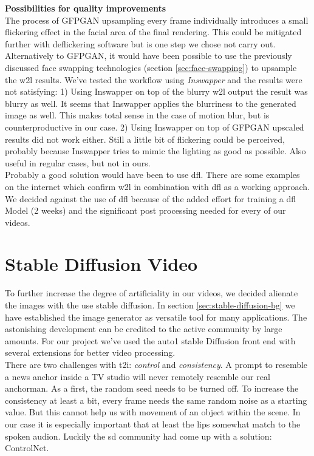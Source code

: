 \documentclass[
  a4paper,  %
  twoside,  %
  bibliography=totoc,
  headsepline,
  cleardoublepage=empty,
  parskip=half,
  draft=false
]{scrbook}
\begin{document}
\textbf{Possibilities for quality improvements} \\
The process of GFPGAN upsampling every frame individually introduces a small flickering effect in the facial area of the final rendering. This could be mitigated further with deflickering software but is one step we chose not carry out. \\ Alternatively to GFPGAN, it would have been possible to use the previously discussed face swapping technologies (section \ref{sec:face-swapping}) to upsample the \gls{w2l} results. We've tested the workflow using \textit{Inswapper} and the results were not satisfying: 1) Using Inswapper on top of the blurry \gls{w2l} output the result was blurry as well. It seems that Inswapper applies the blurriness to the generated image as well. This makes total sense in the case of motion blur, but is counterproductive in our case. 2) Using Inswapper on top of GFPGAN upscaled results did not work either. Still a little bit of flickering could be perceived, probably because Inswapper tries to mimic the lighting as good as possible. Also useful in regular cases, but not in ours. \\
Probably a good solution would have been to use \gls{dfl}. There are some examples on the internet which confirm \gls{w2l} in combination with \gls{dfl} as a working approach. We decided against the use of \gls*{dfl} because of the added effort for training a \gls{dfl} Model (2 weeks) and the significant post processing needed for every of our videos. 


\section{Stable Diffusion Video}
\label{sec:sd-video}
To further increase the degree of artificiality in our videos, we decided alienate the images with the use stable diffusion. In section \ref{sec:stable-diffusion-bg} we have established the image generator as versatile tool for many applications. The astonishing development can be credited to the active community by large amounts. For our project we've used the \gls{auto1} stable Diffusion front end with several extensions for better video processing. \\
There are two challenges with \gls{t2i}: \textit{control} and \textit{consistency}. A prompt to resemble a news anchor inside a TV studio will never remotely resemble our real anchorman. As a first, the random seed needs to be turned off. To increase the consistency at least a bit, every frame needs the same random noise as a starting value. But this cannot help us with movement of an object within the scene. In our case it is especially important that at least the lips somewhat match to the spoken audion. Luckily the \gls{sd} community had come up with a solution: ControlNet. 
\end{document}
